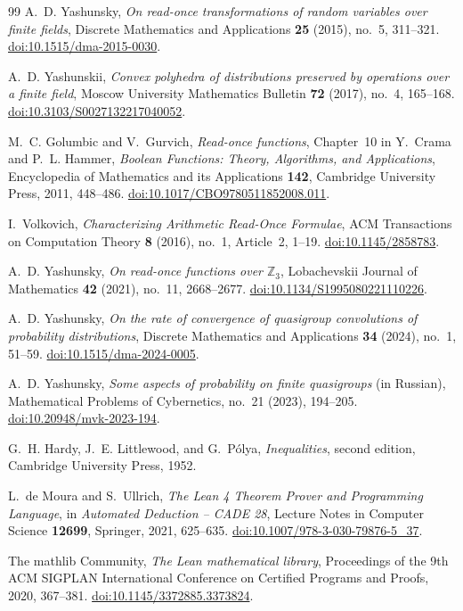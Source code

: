\documentclass[11pt]{article}
\theoremstyle{definition}
\theoremstyle{remark}
\begin{document}
\begin{thebibliography}{99}
A.~D. Yashunsky,
\emph{On read-once transformations of random variables over finite fields},
Discrete Mathematics and Applications \textbf{25} (2015), no.~5, 311--321.
\href{https://doi.org/10.1515/dma-2015-0030}{doi:10.1515/dma-2015-0030}.

A.~D. Yashunskii,
\emph{Convex polyhedra of distributions preserved by operations over a
finite field},
Moscow University Mathematics Bulletin \textbf{72} (2017), no.~4, 165--168.
\href{https://doi.org/10.3103/S0027132217040052}{doi:10.3103/S0027132217040052}.

M.~C. Golumbic and V.~Gurvich,
\emph{Read-once functions},
Chapter~10 in Y.~Crama and P.~L. Hammer, \emph{Boolean Functions: Theory,
Algorithms, and Applications}, Encyclopedia of Mathematics and its
Applications \textbf{142}, Cambridge University Press, 2011, 448--486.
\href{https://doi.org/10.1017/CBO9780511852008.011}{doi:10.1017/CBO9780511852008.011}.

I.~Volkovich,
\emph{Characterizing Arithmetic Read-Once Formulae},
ACM Transactions on Computation Theory \textbf{8} (2016), no.~1, Article~2, 1--19.
\href{https://doi.org/10.1145/2858783}{doi:10.1145/2858783}.

A.~D. Yashunsky,
\emph{On read-once functions over $\mathbb{Z}_3$},
Lobachevskii Journal of Mathematics \textbf{42} (2021), no.~11, 2668--2677.
\href{https://doi.org/10.1134/S1995080221110226}{doi:10.1134/S1995080221110226}.

A.~D. Yashunsky,
\emph{On the rate of convergence of quasigroup convolutions of probability
distributions},
Discrete Mathematics and Applications \textbf{34} (2024), no.~1, 51--59.
\href{https://doi.org/10.1515/dma-2024-0005}{doi:10.1515/dma-2024-0005}.

A.~D. Yashunsky,
\emph{Some aspects of probability on finite quasigroups} (in Russian),
Mathematical Problems of Cybernetics, no.~21 (2023), 194--205.
\href{https://doi.org/10.20948/mvk-2023-194}{doi:10.20948/mvk-2023-194}.

G.~H. Hardy, J.~E. Littlewood, and G.~P\'{o}lya,
\emph{Inequalities}, second edition, Cambridge University Press, 1952.

L.~de Moura and S.~Ullrich,
\emph{The Lean 4 Theorem Prover and Programming Language},
in \emph{Automated Deduction -- CADE 28}, Lecture Notes in Computer Science
\textbf{12699}, Springer, 2021, 625--635.
\href{https://doi.org/10.1007/978-3-030-79876-5_37}{doi:10.1007/978-3-030-79876-5\_37}.

The mathlib Community,
\emph{The Lean mathematical library},
Proceedings of the 9th ACM SIGPLAN International Conference on Certified
Programs and Proofs, 2020, 367--381.
\href{https://doi.org/10.1145/3372885.3373824}{doi:10.1145/3372885.3373824}.

\end{thebibliography}
\end{document}

